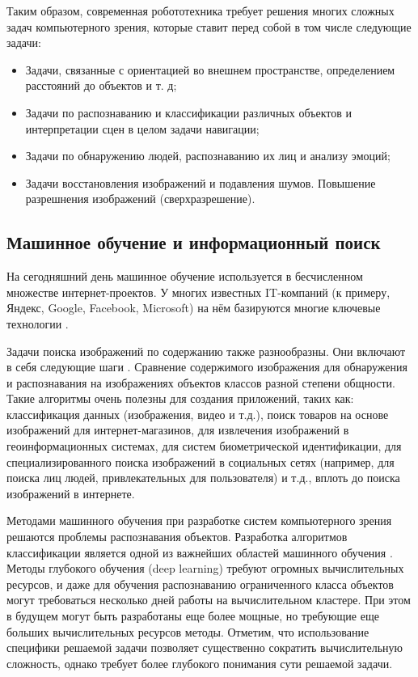 Таким образом, современная робототехника требует решения многих сложных задач компьютерного зрения, которые ставит перед собой в том числе следующие задачи:

\begin{itemize}
	\item Задачи, связанные с ориентацией во внешнем пространстве, определением расстояний до объектов и т. д;
	\item Задачи по распознаванию  и классификации различных объектов и интерпретации сцен в целом задачи навигации;
	\item Задачи по обнаружению людей, распознаванию их лиц и анализу эмоций;
	\item Задачи восстановления изображений и подавления шумов. Повышение разрешнения изображений (сверхразрешение).
\end{itemize}

\subsection{Машинное обучение и информационный поиск}

На сегодняшний день машинное обучение используется в бесчисленном множестве интернет-проектов. У многих известных IT-компаний (к примеру, Яндекс, Google, Facebook, Microsoft) на нём базируются многие ключевые технологии \cite{Cormier2016}.

Задачи поиска изображений по содержанию также разнообразны. Они включают в себя следующие шаги \cite{Meer2000}. Сравнение содержимого изображения для обнаружения и распознавания на изображениях объектов классов разной степени общности. Такие алгоритмы очень полезны для создания приложений, таких как: классификация данных (изображения, видео и т.д.), поиск товаров на основе изображений для интернет-магазинов, для извлечения изображений в геоинформационных системах, для систем биометрической идентификации, для специализированного поиска изображений в социальных сетях (например, для поиска лиц людей, привлекательных для пользователя) \cite{Findface} и т.д., вплоть до поиска изображений в интернете.

Методами машинного обучения при разработке систем компьютерного зрения решаются проблемы распознавания объектов. Разработка алгоритмов классификации является одной из важнейших областей машинного обучения \cite{Murino2000}. Методы глубокого обучения (deep learning) требуют огромных вычислительных ресурсов, и даже для обучения распознаванию ограниченного класса объектов могут требоваться несколько дней работы на вычислительном кластере. При этом в будущем могут быть разработаны еще более мощные, но требующие еще больших вычислительных ресурсов методы.  Отметим, что использование специфики решаемой задачи позволяет существенно сократить вычислительную сложность, однако требует более глубокого понимания сути решаемой задачи.  

